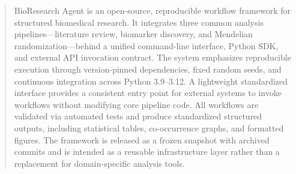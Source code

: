 \begin{abstract}
BioResearch Agent is an open-source, reproducible workflow framework for structured biomedical research. It integrates three common analysis pipelines---literature review, biomarker discovery, and Mendelian randomization---behind a unified command-line interface, Python SDK, and external API invocation contract. The system emphasizes reproducible execution through version-pinned dependencies, fixed random seeds, and continuous integration across Python 3.9--3.12. A lightweight standardized interface provides a consistent entry point for external systems to invoke workflows without modifying core pipeline code. All workflows are validated via automated tests and produce standardized structured outputs, including statistical tables, co-occurrence graphs, and formatted figures. The framework is released as a frozen snapshot with archived commits and is intended as a reusable infrastructure layer rather than a replacement for domain-specific analysis tools.
\end{abstract}